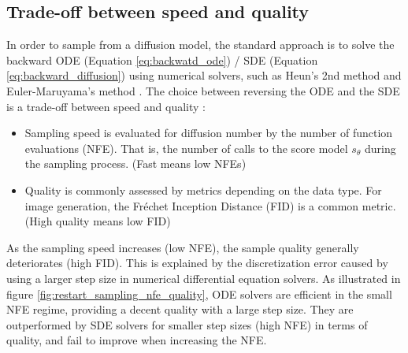 \subsection{Trade-off between speed and quality}
In order to sample from a diffusion model, the standard approach is to solve the backward ODE (Equation \ref{eq:backwatd_ode}) / SDE (Equation \ref{eq:backward_diffusion}) using numerical solvers, such as Heun's 2nd method and Euler-Maruyama's method \citep{kpj1992numerical}. The choice between reversing the ODE and the SDE is a trade-off between speed and quality : 
\begin{itemize}
    \item Sampling speed is evaluated for diffusion number by the number of function evaluations (NFE). That is, the number of calls to the score model $s_{\theta}$ during the sampling process. (Fast means low NFEs)
    \item Quality is commonly assessed by metrics depending on the data type. For image generation, the Fréchet Inception Distance (FID) \citep{heusel2017gans} is a common metric. (High quality means low FID)
\end{itemize}
As the sampling speed increases (low NFE), the sample quality generally deteriorates (high FID). This is explained by the discretization error caused by using a larger step size in numerical differential equation solvers.
As illustrated in figure \ref{fig:restart_sampling_nfe_quality}, ODE solvers are efficient in the small NFE regime, providing a decent quality with a large step size. They are outperformed by SDE solvers for smaller step sizes (high NFE) in terms of quality, and fail to improve when increasing the NFE.
